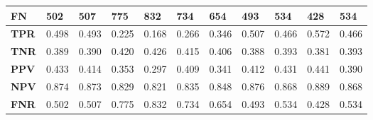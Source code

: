 \documentclass[a4paper]{article}
\begin{document}
\begin{table}[H]
\begin{tabular}{l|l|l|l|l|l|l|l|l|l|l|}
        \multicolumn{1}{|l|}{\textbf{FN}}  & 502                           & 507                           & 775                           & 832                           & 734                           & 654                           & 493                           & 534                           & 428                           & 534                           \\ \hline
        \multicolumn{1}{|l|}{\textbf{TPR}} & \cellcolor[HTML]{FFCCC9}0.498 & \cellcolor[HTML]{FFCCC9}0.493 & \cellcolor[HTML]{FD6864}0.225 & \cellcolor[HTML]{FD6864}0.168 & \cellcolor[HTML]{FD6864}0.266 & \cellcolor[HTML]{FD6864}0.346 & \cellcolor[HTML]{FFCCC9}0.507 & \cellcolor[HTML]{FFCCC9}0.466 & \cellcolor[HTML]{FFCCC9}0.572 & \cellcolor[HTML]{FFCCC9}0.466 \\ \hline
        \multicolumn{1}{|l|}{\textbf{TNR}} & \cellcolor[HTML]{FFFFFF}0.389 & \cellcolor[HTML]{FFFFFF}0.390 & \cellcolor[HTML]{FFFFFF}0.420 & \cellcolor[HTML]{FFFFFF}0.426 & \cellcolor[HTML]{FFFFFF}0.415 & \cellcolor[HTML]{FFFFFF}0.406 & \cellcolor[HTML]{FFFFFF}0.388 & \cellcolor[HTML]{FFFFFF}0.393 & \cellcolor[HTML]{FFFFFF}0.381 & \cellcolor[HTML]{FFFFFF}0.393 \\ \hline
        \multicolumn{1}{|l|}{\textbf{PPV}} & \cellcolor[HTML]{FFFFFF}0.433 & \cellcolor[HTML]{FFFFFF}0.414 & \cellcolor[HTML]{FFFFFF}0.353 & \cellcolor[HTML]{FFFFFF}0.297 & \cellcolor[HTML]{FFFFFF}0.409 & \cellcolor[HTML]{FFFFFF}0.341 & \cellcolor[HTML]{FFFFFF}0.412 & \cellcolor[HTML]{FFFFFF}0.431 & \cellcolor[HTML]{FFFFFF}0.441 & \cellcolor[HTML]{FFFFFF}0.390 \\ \hline
        \multicolumn{1}{|l|}{\textbf{NPV}} & \cellcolor[HTML]{FFFFFF}0.874 & \cellcolor[HTML]{FFFFFF}0.873 & \cellcolor[HTML]{FFFFFF}0.829 & \cellcolor[HTML]{FFFFFF}0.821 & \cellcolor[HTML]{FFFFFF}0.835 & \cellcolor[HTML]{FFFFFF}0.848 & \cellcolor[HTML]{FFFFFF}0.876 & \cellcolor[HTML]{FFFFFF}0.868 & \cellcolor[HTML]{FFFFFF}0.889 & \cellcolor[HTML]{FFFFFF}0.868 \\ \hline
        \multicolumn{1}{|l|}{\textbf{FNR}} & \cellcolor[HTML]{FFCCC9}0.502 & \cellcolor[HTML]{FFCCC9}0.507 & \cellcolor[HTML]{FD6864}0.775 & \cellcolor[HTML]{FD6864}0.832 & \cellcolor[HTML]{FD6864}0.734 & \cellcolor[HTML]{FD6864}0.654 & \cellcolor[HTML]{FFCCC9}0.493 & \cellcolor[HTML]{FFCCC9}0.534 & \cellcolor[HTML]{FFCCC9}0.428 & \cellcolor[HTML]{FFCCC9}0.534 \\ \hline
    \end{tabular}
\end{table}
\end{document}
